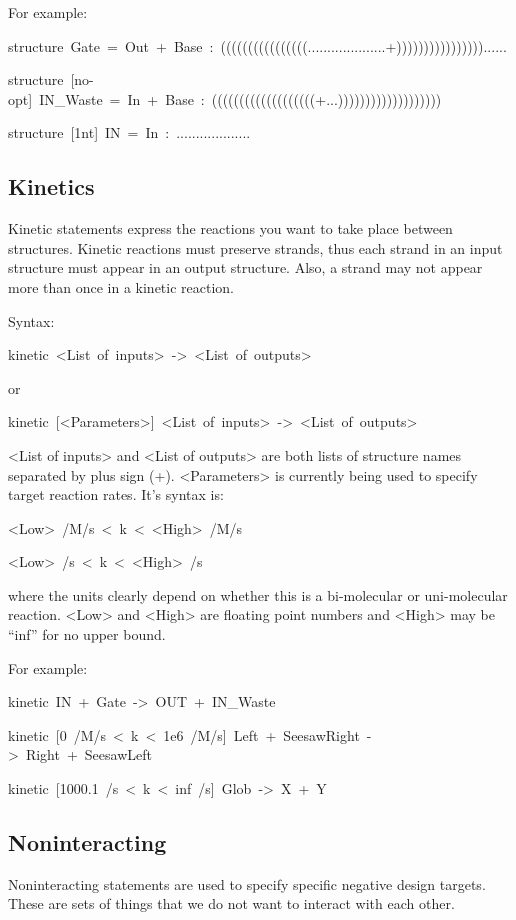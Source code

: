 \documentclass{article}
\newenvironment{code}
{\par\begin{list}{}{
\setlength{\rightmargin}{\leftmargin}
\setlength{\listparindent}{0pt}
\raggedright
\setlength{\itemsep}{0pt}
\setlength{\parsep}{0pt}
\normalfont\ttfamily}
 \item[]}
{\end{list}}
\begin{document}
For example:
\begin{code}
structure~Gate~=~Out~+~Base~:~((((((((((((((((....................+))))))))))))))))......

structure~{[}no-opt{]}~IN\_Waste~=~In~+~Base~:~(((((((((((((((((((+...)))))))))))))))))))

structure~{[}1nt{]}~IN~=~In~:~...................
\end{code}

\subsection{Kinetics}

Kinetic statements express the reactions you want to take place between
structures. Kinetic reactions must preserve strands, thus each strand
in an input structure must appear in an output structure. Also, a
strand may not appear more than once in a kinetic reaction.

Syntax:
\begin{code}
kinetic~<List~of~inputs>~->~<List~of~outputs>
\end{code}
or
\begin{code}
kinetic~{[}<Parameters>{]}~<List~of~inputs>~->~<List~of~outputs>
\end{code}
<List of inputs> and <List of outputs> are both lists of structure
names separated by plus sign (+). <Parameters> is currently being
used to specify target reaction rates. It's syntax is:
\begin{code}
<Low>~/M/s~<~k~<~<High>~/M/s

<Low>~/s~<~k~<~<High>~/s
\end{code}
where the units clearly depend on whether this is a bi-molecular or
uni-molecular reaction. <Low> and <High> are floating point numbers
and <High> may be {}``inf'' for no upper bound.

For example:
\begin{code}
kinetic~IN~+~Gate~->~OUT~+~IN\_Waste

kinetic~{[}0~/M/s~<~k~<~1e6~/M/s{]}~Left~+~SeesawRight~->~Right~+~SeesawLeft

kinetic~{[}1000.1~/s~<~k~<~inf~/s{]}~Glob~->~X~+~Y
\end{code}

\subsection{Noninteracting}

Noninteracting statements are used to specify specific negative design
targets. These are sets of things that we do not want to interact
with each other.
\end{document}
